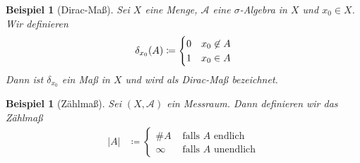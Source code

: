 \documentclass[11pt, twoside, a4paper]{article}
\theoremstyle{plain}
\newtheorem{beispiel}[blockelement]{Beispiel}
\numberwithin{equation}{subsection}
\newcommand{\pair}[1]{\left(#1\right)}
\newcommand{\of}[1]{\mathopen{}\mathclose{}\bgroup\left(#1\aftergroup\egroup\right)}
\newcommand{\abs}[1]{\left\lvert#1\right\rvert}
\newcommand{\mA}{\mathcal{A}}
\begin{document}
    \begin{beispiel}[Dirac-Maß]
        Sei $X$ eine Menge, $\mA$ eine $\sigma$-Algebra in $X$ und $x_0\in X$. Wir definieren
        \begin{align*}
            \delta_{x_0}\of{A} \coloneqq \begin{cases}
                                             0 &x_0\not\in A\\
                                             1 &x_0\in A
            \end{cases}
        \end{align*}
        Dann ist $\delta_{x_0}$ ein Maß in $X$ und wird als \textit{Dirac}-Maß bezeichnet.
    \end{beispiel}

    \begin{beispiel}[Zählmaß]
        Sei $\pair{X, \mA}$ ein Messraum. Dann definieren wir das Zählmaß
        \begin{align*}
            \abs{A} &\coloneqq \begin{cases}
                                   \#A &\text{ falls $A$ endlich}\\
                                   \infty &\text{ falls $A$ unendlich}
            \end{cases}
        \end{align*}
    \end{beispiel}
\end{document}
